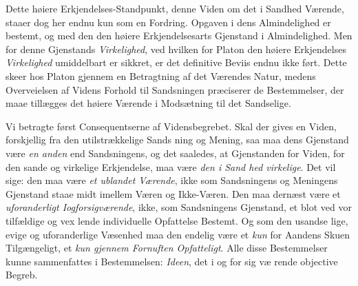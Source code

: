 \documentclass[12pt,a4paper]{book}
\begin{document}
Dette høiere Erkjendelses-Standpunkt, denne Viden om
det i Sandhed Værende, staaer dog her endnu kun som en
Fordring. Opgaven i dens Almindelighed er bestemt, og med
den den høiere Erkjendelsesarts Gjenstand i Almindelighed.
Men for denne Gjenstands \emph{Virkelighed}, ved hvilken for
Platon den høiere Erkjendelses \emph{Virkelighed} umiddelbart
er sikkret, er det definitive Beviis endnu ikke ført. Dette
skeer hos Platon gjennem en Betragtning af det Værendes
Natur, medens Overveielsen af Videns Forhold til Sandsningen
præciserer de Bestemmelser, der maae tillægges det høiere
Værende i Modsætning til det Sandselige.

Vi betragte først Consequentserne af Vidensbegrebet. Skal
der gives en Viden, forskjellig fra den utilstrækkelige Sands\-%
ning og Mening, saa maa dens Gjenstand være \emph{en anden} end
Sandsningens, og det saaledes, at Gjenstanden for Viden, for
den sande og virkelige Erkjendelse, maa være \emph{den i Sand\-%
hed virkelige}. Det vil sige: den maa være \emph{et ublandet
Værende}, ikke som Sandsningens og Meningens Gjenstand
staae midt imellem Væren og Ikke-Væren. Den maa dernæst
være et \emph{uforanderligt Iogforsigværende}, ikke, som
Sandsningens Gjenstand, et blot ved vor tilfældige og vex\-%
lende individuelle Opfattelse Bestemt. Og som den usandse\-%
lige, evige og uforanderlige Væsenhed maa den endelig være
et \emph{kun} for Aandens Skuen Tilgængeligt, et \emph{kun gjennem
Fornuften Opfatteligt}. Alle disse Bestemmelser kunne
sammenfattes i Bestemmelsen: \emph{Ideen}, det i og for sig væ\-%
rende objective Begreb.
\end{document}
